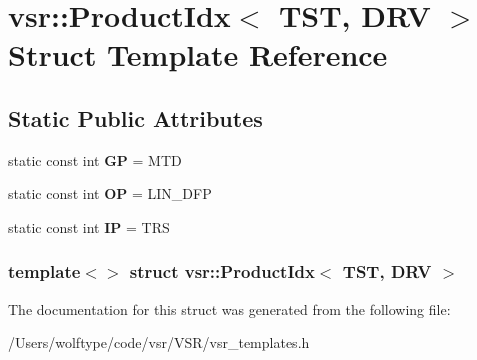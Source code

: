 \hypertarget{structvsr_1_1_product_idx_3_01_t_s_t_00_01_d_r_v_01_4}{\section{vsr\-:\-:Product\-Idx$<$ T\-S\-T, D\-R\-V $>$ Struct Template Reference}
\label{structvsr_1_1_product_idx_3_01_t_s_t_00_01_d_r_v_01_4}
}
\subsection*{Static Public Attributes}
\begin{DoxyCompactItemize}
\item 
\hypertarget{structvsr_1_1_product_idx_3_01_t_s_t_00_01_d_r_v_01_4_a47775a6b02013d5b184976b57a4b44d8}{static const int {\bfseries G\-P} = M\-T\-D}\label{structvsr_1_1_product_idx_3_01_t_s_t_00_01_d_r_v_01_4_a47775a6b02013d5b184976b57a4b44d8}

\item 
\hypertarget{structvsr_1_1_product_idx_3_01_t_s_t_00_01_d_r_v_01_4_acb2cbdf66fbe77d1dc11d01c1223c29a}{static const int {\bfseries O\-P} = L\-I\-N\-\_\-\-D\-F\-P}\label{structvsr_1_1_product_idx_3_01_t_s_t_00_01_d_r_v_01_4_acb2cbdf66fbe77d1dc11d01c1223c29a}

\item 
\hypertarget{structvsr_1_1_product_idx_3_01_t_s_t_00_01_d_r_v_01_4_a4bf66a44fc2991c62cd4ef43b0eae502}{static const int {\bfseries I\-P} = T\-R\-S}\label{structvsr_1_1_product_idx_3_01_t_s_t_00_01_d_r_v_01_4_a4bf66a44fc2991c62cd4ef43b0eae502}

\end{DoxyCompactItemize}
\subsubsection*{template$<$$>$ struct vsr\-::\-Product\-Idx$<$ T\-S\-T, D\-R\-V $>$}



The documentation for this struct was generated from the following file\-:\begin{DoxyCompactItemize}
\item 
/\-Users/wolftype/code/vsr/\-V\-S\-R/vsr\-\_\-templates.\-h\end{DoxyCompactItemize}

